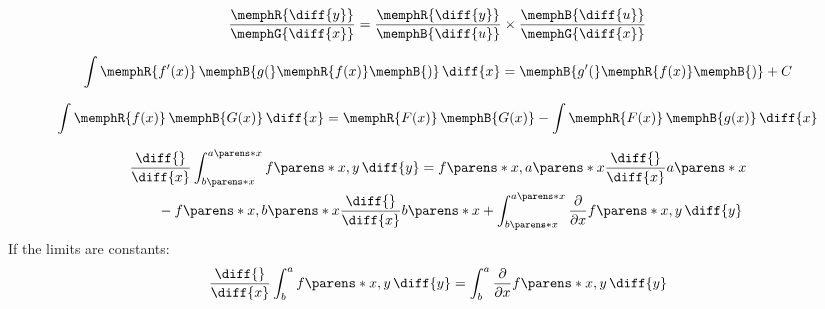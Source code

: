 \begin{multicols}{2}
\begin{CheatsheetEntryFrame}
        \begin{equation*}
            \frac{\memphR{\diff{y}}}{\memphG{\diff{x}}}
                = \frac{\memphR{\diff{y}}}{\memphB{\diff{u}}} \times \frac{\memphB{\diff{u}}}{\memphG{\diff{x}}}
        \end{equation*}

    \end{CheatsheetEntryFrame}

    \begin{CheatsheetEntryFrame}

        \begin{equation*}
            \int{\memphR{f'(x)} \, \memphB{g(}\memphR{f(x)}\memphB{)} \,\diff{x}}
                = \memphB{g'(}\memphR{f(x)}\memphB{)} + C
        \end{equation*}

        \begin{equation*}
            \int{\memphR{f(x)} \, \memphB{G(x)} \,\diff{x}}
            = \memphR{F(x)} \, \memphB{G(x)} - \int{\memphR{F(x)} \, \memphB{g(x)} \,\diff{x}}
        \end{equation*}

    \end{CheatsheetEntryFrame}

    \begin{CheatsheetEntryFrame}

        \begin{align*}
            &\frac{\diff{}}{\diff{x}}
            \int_{b\parens*{x}}^{a\parens*{x}} f\parens*{x,y} \,\diff{y}
            = f \parens*{x, a\parens*{x}} \frac{\diff{}}{\diff{x}} a\parens*{x}
            \\
            &\qquad
            - f \parens*{x, b\parens*{x}} \frac{\diff{}}{\diff{x}} b\parens*{x}
            + \int_{b\parens*{x}}^{a\parens*{x}}{
                \frac{\partial{}}{\partial{x}} f\parens*{x,y} \,\diff{y}
            }
        \end{align*}
        If the limits are constants:
        \begin{gather*}
            \frac{\diff{}}{\diff{x}}
            \int_b^a f\parens*{x,y} \,\diff{y}
            = \int_b^a \frac{\partial{}}{\partial{x}} f\parens*{x,y} \,\diff{y}
        \end{gather*}

    \end{CheatsheetEntryFrame}

    \MulticolsBreak

    \MulticolsPhantomPlaceholder

\end{multicols}

